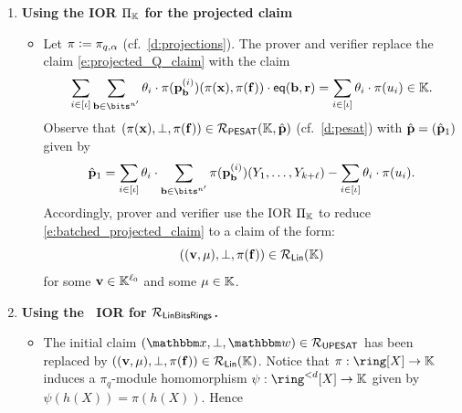 \documentclass[11pt,letterpaper,usenames,dvipsnames]{article}
\begin{document}
\begin{construction}
\begin{enumerate}[leftmargin=*]
\begin{itemize}[leftmargin=*]
These values can be computed as one would compute the corresponding values in a univariate skip, see \cref{s:univ_skip_ideal_membership} . Alternatively, if $Q^{(i)}$ is linear on the multilinear extension of $\bff$, then  $u_i$ can easily be computed from $\mle{\pi_q(\bff)}(\rr)$, which in turn can be computed as $\moduledegree$ MLE evaluations over $\pi_q(\ring)$\footnote{This was already observed at least in \cite{flock}, when $Q^{(i)}$ is the multilinear extension of the vector $C\cdot \zz$ in an R1CS constraint .}.
\item The verifier checks that $u_i \in \pi_q(\ideal_i)$ for all $i\in [\iota]$. Then it samples and sends batching elements $\theta_1, \ldots, \theta_\iota\in \KK$. Further, if $\moduledegree>0$, it samples and sends an element $\alpha$ . 
\end{itemize}
\item \textbf{Using the IOR $\Pi_{\mathbb{K}}$ for the projected claim}
\begin{itemize}[leftmargin=*]
\item Let $\pi{\;\vcentcolon=\;} \pi_{q,\alpha}$ (cf.\ \cref{d:projections}). The prover and verifier replace the claim \eqref{e:projected_Q_claim} with the claim 
%
\begin{equation}\label{e:batched_projected_claim}
\sum_{i\in [\iota]}\sum_{\bb\in \bits^{n'}}\theta_i\cdot \pi(\pp_\bb^{(i)})(\pi(\xx),\pi(\bff)) \cdot \eq(\bb, \rr) = \sum_{i\in [\iota]} \theta_i \cdot \pi(u_i) \in \KK.
\end{equation}
%
Observe that $(\pi(\mathbf{x}),\bot, \pi(\mathbf{f}))\in \mathcal{R}_{\mathsf{PESAT}}(\mathbb{K},\hat{\mathbf{p}})$ (cf.\ \cref{d:pesat})
with $\hat{\mathbf{p}}=(\hat{\mathbf{p}}_1)$ given by $$\hat{\pp}_1=\sum_{i\in[\iota]}\theta_i\cdot\sum_{\bb\in \bits^{n'}}\pi(\pp_{\bb}^{(i)})(Y_1, \ldots, Y_{\inplen+\codedim})-\sum_{i\in [\iota]} \theta_i\cdot \pi(u_i).$$ 
%
Accordingly, prover and verifier use the IOR $\Pi_{\mathbb{K}}$  to reduce \eqref{e:batched_projected_claim} to 
 a claim of the form:
\begin{equation}\label{e:iop_linear_claim_raw}
((\mathbf{v},\mu), \bot, \pi(\mathbf{f}))\in \mathcal{R}_{\mathsf{Lin}}(\mathbb{K})
\end{equation}
%
for some $\mathbf{v} \in \mathbb{K}^{ \ell_0}$  and some $\mu\in \mathbb{K}$.
\end{itemize}
\item \textbf{Using the \ftwoz \ IOR for $\mathcal{R}_{\mathsf{LinBitsRings}}$.}
\begin{itemize}[leftmargin=*]
\item The initial claim $(\inp,\bot,\wit)\in \PIMSAT$ has been replaced by $((\mathbf{v},\mu),\bot,\pi(\mathbf{f}))\in \mathcal{R}_{\mathsf{Lin}}(\mathbb{K})$.  Notice that $\pi:\ring[X] \to \KK$ induces a $\pi_q$-module homomorphism $\psi:\ringdegbound{\moduledegree}[X] \to \KK$ given by $\psi(h(X)) = \pi(h(X))$. Hence

\end{itemize}
\end{enumerate}
\end{construction}
\end{document}
